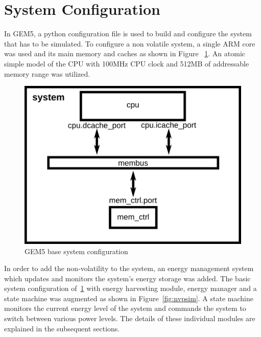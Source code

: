 \documentclass[conference]{IEEEtran}
\begin{document}
\section{\textbf{System Configuration}}
In GEM5, a python configuration file is used to build and configure the system that has to be simulated. To configure a non volatile system, a single ARM core was used and its main memory and caches as shown in Figure ~\ref{fig:basic_block}. An atomic simple model of the CPU with 100MHz CPU clock and 512MB of addressable memory range was utilized. 

\begin{figure}[htbp]
\centerline{\includegraphics[scale=0.85]{simple_config.png}}
\caption{GEM5 base system configuration}
\label{fig:basic_block}
\end{figure}

In order to add the non-volatility to the system, an energy management system which updates and monitors the system's energy storage was added. The basic system configuration of~\ref{fig:basic_block} with energy harvesting module, energy manager and a state machine was augmented as shown in Figure~\ref{fig:nvpsim}. A state machine monitors the current energy level of the system and commands the system to switch between various power levels. The details of these individual modules are explained in the subsequent sections.
\end{document}
